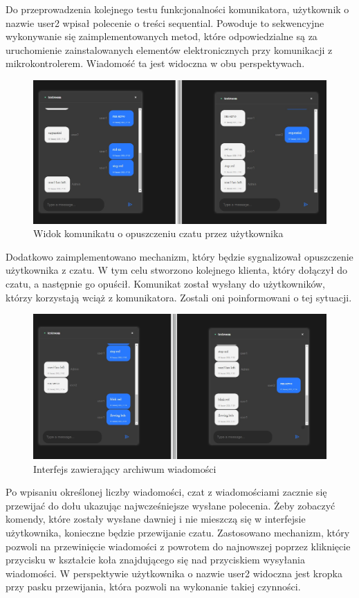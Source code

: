 Do przeprowadzenia kolejnego testu funkcjonalności komunikatora, użytkownik o nazwie user2 wpisał polecenie o treści sequential. Powoduje to sekwencyjne wykonywanie się zaimplementowanych metod, które odpowiedzialne są za uruchomienie zainstalowanych elementów elektronicznych przy komunikacji z mikrokontrolerem. Wiadomość ta jest widoczna w obu perspektywach. 

\begin{figure}[htbp]
	\centering
	\includegraphics[width=0.5\linewidth]{"obrazy/TESTuser3"}
	\caption{Widok komunikatu o opuszczeniu czatu przez użytkownika}
	\label{fig:47}
\end{figure}
\newpage
Dodatkowo zaimplementowano mechanizm, który będzie sygnalizował opuszczenie użytkownika z czatu. W tym celu stworzono kolejnego klienta, który dołączył do czatu, a następnie go opuścił. Komunikat został wysłany do użytkowników, którzy korzystają wciąż z komunikatora. Zostali oni poinformowani o tej sytuacji.
\begin{figure}[htbp]
	\centering
	\includegraphics[width=0.5\linewidth]{"obrazy/TESTflowingleds"}
	\caption{Interfejs zawierający archiwum wiadomości}
	\label{fig:48}
\end{figure}
\newpage
Po wpisaniu określonej liczby wiadomości, czat z wiadomościami zacznie się przewijać do dołu ukazując najwcześniejsze wysłane polecenia. Żeby zobaczyć komendy, które zostały wysłane dawniej  i nie mieszczą się w interfejsie użytkownika, konieczne będzie przewijanie czatu. Zastosowano mechanizm, który pozwoli na przewinięcie wiadomości z powrotem do najnowszej poprzez kliknięcie przycisku w kształcie koła znajdującego się nad przyciskiem wysyłania wiadomości. W perspektywie użytkownika o nazwie user2 widoczna jest kropka przy pasku przewijania, która pozwoli na wykonanie takiej czynności.


